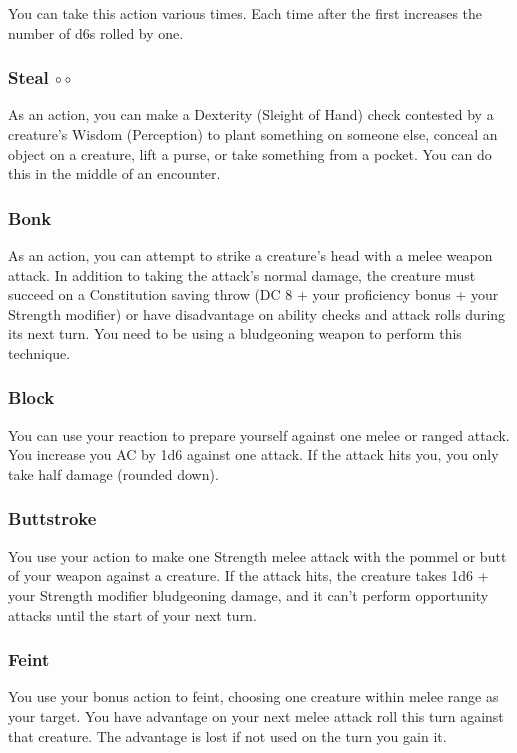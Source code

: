     You can take this action various times.
    Each time after the first increases the number of d6s rolled by one.

\subsubsection{Steal $\circ\circ$} \label{act::steal}
    As an action, you can make a Dexterity (Sleight of Hand) check contested by a creature's Wisdom (Perception) to plant something on someone else, conceal an object on a creature, lift a purse, or take something from a pocket.
    You can do this in the middle of an encounter.

\subsubsection{Bonk} \label{tec::bonk}
As an action, you can attempt to strike a creature's head with a melee weapon attack.
In addition to taking the attack's normal damage, the creature must succeed on a Constitution saving throw (DC 8 + your proficiency bonus + your Strength modifier) or have disadvantage on ability checks and attack rolls during its next turn.
You need to be using a bludgeoning weapon to perform this technique.

\subsubsection{Block} \label{tec::block}
You can use your reaction to prepare yourself against one melee or ranged attack.
You increase you AC by 1d6 against one attack.
If the attack hits you, you only take half damage (rounded down).

\subsubsection{Buttstroke} \label{tec::buttstroke}
You use your action to make one Strength melee attack with the pommel or butt of your weapon against a creature.
If the attack hits, the creature takes 1d6 + your Strength modifier bludgeoning damage, and it can't perform opportunity attacks until the start of your next turn.

\subsubsection{Feint} \label{tec::feint}
You use your bonus action to feint, choosing one creature within melee range as your target.
You have advantage on your next melee attack roll this turn against that creature.
The advantage is lost if not used on the turn you gain it.

